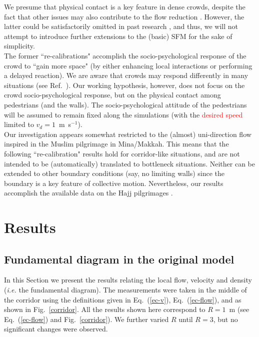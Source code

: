 \documentclass[preprint,12pt]{elsarticle}
\begin{document}
 We presume that physical contact is
a key feature in dense crowds, despite the fact that other issues may
also contribute to the flow reduction \cite{johansson1}. However, the latter could
be satisfactorily omitted in past research \cite{johansson}, and thus, we will not
attempt to introduce further extensions to the (basic) SFM for the
sake of simplicity.\\

The former ``re-calibrations" accomplish the socio-psychological
response of the crowd to ``gain more space" (by either enhancing local
interactions or performing a delayed reaction). We are aware that
crowds may respond differently in many situations (see Ref.~\cite{drury1}). Our working
hypothesis, however, does not focus on the crowd socio-psychological
response, but on the physical contact among pedestrians (and the
walls). The socio-psychological attitude of the pedestrians will be
assumed to remain fixed along the simulations (with the 
\textcolor{red}{desired speed} limited to $v_d=1\,$ m~s$^{-1}$). \\


Our investigation appears somewhat restricted to the (almost)
uni-direction flow inspired in the Muslim pilgrimage in Mina/Makkah.
This means that the following ``re-calibration" results hold for
corridor-like situations, and are not intended to be (automatically)
translated to bottleneck situations. Neither can be extended to other
boundary conditions (say, no limiting walls) since the boundary is a
key feature of collective motion. Nevertheless, our results accomplish
the available data on the Hajj pilgrimages \cite{helbing3,lohner1}.



\section{\label{results}Results}


\subsection{\label{fundamental_diagram} Fundamental diagram in the original model}

In this Section we present the results relating the local flow, velocity and density (\textit{i.e.} the fundamental diagram). The measurements were taken in the middle of the corridor using the definitions given in Eq.~(\ref{ec-v}), Eq.~(\ref{ec-flow}), and as shown in Fig.~\ref{corridor}. All the results shown here correspond to $R=1$~m (see Eq.~(\ref{ec-flow}) and Fig.~\ref{corridor}). We further varied $R$ until $R=3$, but no significant changes were observed. \\
\end{document}
